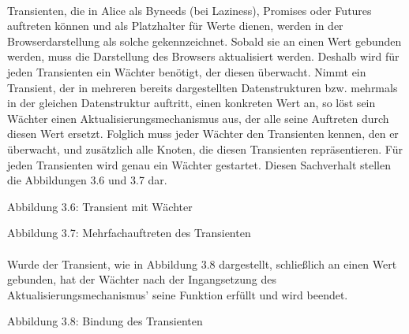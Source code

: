 \documentclass[12pt,a4paper]{article}
\begin{document}
\paragraph{}

Transienten, die in Alice als Byneeds (bei Laziness), 
Promises oder Futures auftreten k\"onnen und als Platzhalter f\"ur Werte
dienen, werden in der Browserdarstellung
als solche gekennzeichnet. Sobald sie an einen Wert gebunden werden, muss
die Darstellung des Browsers aktualisiert werden. Deshalb wird
f\"ur jeden Transienten ein W\"achter ben\"otigt, der diesen \"uberwacht.
Nimmt ein Transient, der in mehreren bereits dargestellten 
Datenstrukturen bzw. mehrmals in der gleichen Datenstruktur auftritt, 
einen konkreten Wert an, so l\"ost sein W\"achter einen 
Aktualisierungsmechanismus aus, der alle seine Auftreten durch diesen 
Wert ersetzt. Folglich muss jeder W\"achter den Transienten kennen, 
den er \"uberwacht, und zus\"atzlich alle Knoten, die diesen 
Transienten repr\"asentieren. F\"ur jeden 
Transienten wird genau ein W\"achter gestartet. Diesen Sachverhalt stellen 
die Abbildungen 3.6 und 3.7 dar.

\begin{center}
\linebreak 
Abbildung 3.6: Transient mit W\"{a}chter
\end{center}

\begin{center}
\linebreak 
Abbildung 3.7: Mehrfachauftreten des Transienten
\end{center}

\paragraph{}

Wurde der Transient, wie in Abbildung 3.8 dargestellt, schlie\ss lich
an einen Wert gebunden, hat der W\"achter nach der Ingangsetzung des
Aktualisierungsmechanismus' seine Funktion erf\"ullt und
wird beendet.

\begin{center}
\linebreak 
Abbildung 3.8: Bindung des Transienten
\end{center}

\paragraph{}
\end{document}
